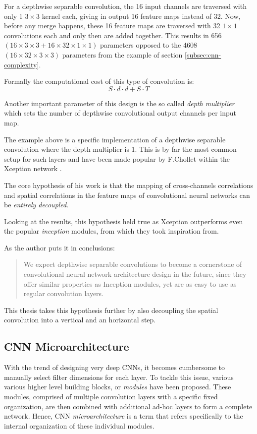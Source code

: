 For a depthwise separable convolution, the 16 input channels are traversed with only 1 $3 \times 3$ kernel each, giving in output 16 feature maps instead of 32. Now, before any merge happens, these 16 feature maps are traversed with 32 $1 \times 1$ convolutions each and only then are added together. This results in 656 $(16\times3\times3 + 16\times32\times1\times1)$ parameters opposed to the 4608 $(16\times32\times3\times3)$ parameters from the example of section \ref{subsec:cnn-complexity}.  

Formally the computational cost of this type of convolution is: 
\begin{equation}
    S\cdot d \cdot d + S \cdot T 
\end{equation}

Another important parameter of this design is the so called \emph{depth multiplier} which sets the number of depthwise convolutional output channels per input map. 

The example above is a specific implementation of a depthwise separable convolution where the depth multiplier is 1. This is by far the most common setup for such layers and have been made popular by F.Chollet within the Xception network \parencite{Xception}. 
\newline 

The core hypothesis of his work is that the mapping of cross-channels correlations and spatial correlations in the feature maps of convolutional neural networks can be \emph{entirely decoupled}. 


Looking at the results, this hypothesis held true as Xception outperforms even the popular \emph{inception} modules, from which they took inspiration from.

As the author puts it in conclusions: 
\begin{quote}
    We expect depthwise separable convolutions to become a cornerstone of convolutional neural network architecture design in the future,  since they offer similar properties as Inception modules, yet are as easy to use as regular convolution layers. 
\end{quote}

This thesis takes this hypothesis further by also decoupling the spatial convolution into a vertical and an horizontal step. 

\subsection{CNN Microarchitecture}
\label{subsec:arch}
With the trend of designing very deep CNNs, it becomes cumbersome to manually select filter dimensions for each layer. To tackle this issue, various various higher level building blocks, or \emph{modules} have been proposed. These modules, comprised of multiple convolution layers with a specific fixed organization, are then combined with additional ad-hoc layers to form a complete network. Hence, CNN \emph{microarchitecture} is a term that refers specifically to the internal organization of these individual modules. 

